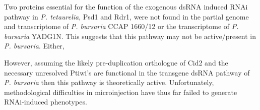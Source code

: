 Two proteins essential for the function of the exogenous dsRNA induced
RNAi pathway in \textit{P. tetaurelia}, Psd1 and Rdr1, were not found in the partial genome and transcriptome 
of \textit{P. bursaria} CCAP 1660/12 or the transcriptome of \textit{P. bursaria} YADG1N.
This suggests that this pathway may not be active/present in \textit{P. bursaria}.
Either, 


However, assuming the likely pre-duplication orthologue of Cid2 and the necessary 
unresolved Ptiwi's are functional
in the transgene dsRNA pathway of \textit{P. bursaria}
then this pathway is theoretically active.  Unfortunately, methodological
difficulties in microinjection have thus far failed to generate RNAi-induced
phenotypes.
